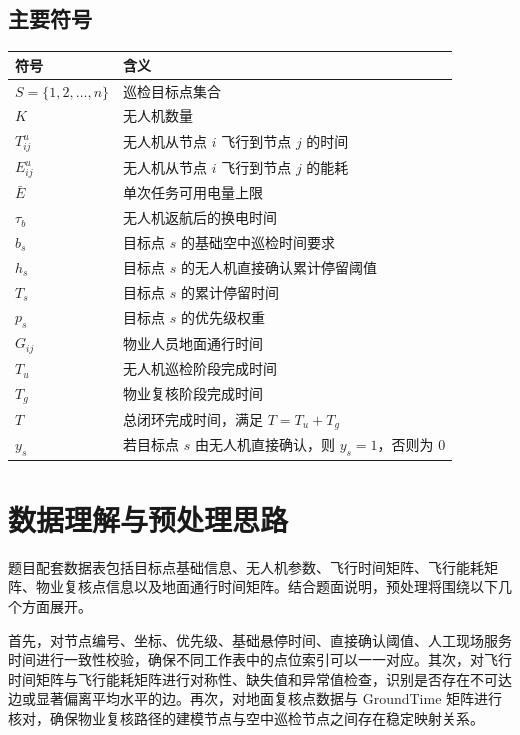 \documentclass[12pt]{article}
\begin{document}
\subsection{主要符号}

\begin{table}[H]
\centering
\begin{tabular}{>{\raggedright\arraybackslash}p{3cm} >{\raggedright\arraybackslash}p{9.5cm}}
\toprule
符号 & 含义 \\
\midrule
$S=\{1,2,\dots,n\}$ & 巡检目标点集合 \\
$K$ & 无人机数量 \\
$T_{ij}^{u}$ & 无人机从节点 $i$ 飞行到节点 $j$ 的时间 \\
$E_{ij}^{u}$ & 无人机从节点 $i$ 飞行到节点 $j$ 的能耗 \\
$\bar{E}$ & 单次任务可用电量上限 \\
$\tau_b$ & 无人机返航后的换电时间 \\
$b_s$ & 目标点 $s$ 的基础空中巡检时间要求 \\
$h_s$ & 目标点 $s$ 的无人机直接确认累计停留阈值 \\
$T_s$ & 目标点 $s$ 的累计停留时间 \\
$p_s$ & 目标点 $s$ 的优先级权重 \\
$G_{ij}$ & 物业人员地面通行时间 \\
$T_u$ & 无人机巡检阶段完成时间 \\
$T_g$ & 物业复核阶段完成时间 \\
$T$ & 总闭环完成时间，满足 $T=T_u+T_g$ \\
$y_s$ & 若目标点 $s$ 由无人机直接确认，则 $y_s=1$，否则为 0 \\
\bottomrule
\end{tabular}
\end{table}

\section{数据理解与预处理思路}
题目配套数据表包括目标点基础信息、无人机参数、飞行时间矩阵、飞行能耗矩阵、物业复核点信息以及地面通行时间矩阵。结合题面说明，预处理将围绕以下几个方面展开。

首先，对节点编号、坐标、优先级、基础悬停时间、直接确认阈值、人工现场服务时间进行一致性校验，确保不同工作表中的点位索引可以一一对应。其次，对飞行时间矩阵与飞行能耗矩阵进行对称性、缺失值和异常值检查，识别是否存在不可达边或显著偏离平均水平的边。再次，对地面复核点数据与 GroundTime 矩阵进行核对，确保物业复核路径的建模节点与空中巡检节点之间存在稳定映射关系。
\end{document}

